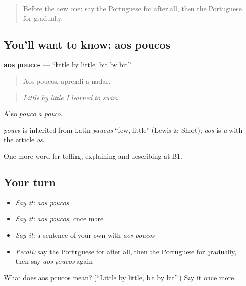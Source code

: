 \label{lesson:PT-C274-aos-poucos}



\begin{quote}
Before the new one: say the Portuguese for after all, then the Portuguese for gradually.
\end{quote}

\subsection*{You'll want to know: aos poucos}
\textbf{aos poucos} — \textquotedblleft{}little by little, bit by bit\textquotedblright{}.

\begin{quote}
Aos poucos, aprendi a nadar.
\end{quote}

\begin{quote}
\emph{Little by little I learned to swim.}
\end{quote}

Also \emph{pouco a pouco}.

\begin{cousinweb}
\emph{pouco} is inherited from Latin \emph{paucus} \textquotedblleft{}few, little\textquotedblright{} (Lewis \& Short); \emph{aos} is \emph{a} with the article \emph{os}.
\end{cousinweb}

\begin{grammarlens}[title={What you've built}]
One more word for telling, explaining and describing at B1.
\end{grammarlens}

\subsection*{Your turn}
\begin{itemize}
\raggedright
  \item \emph{Say it:} \emph{aos poucos}
  \item \emph{Say it:} \emph{aos poucos}, once more
  \item \emph{Say it:} a sentence of your own with \emph{aos poucos}
  \item \emph{Recall:} say the Portuguese for after all, then the Portuguese for gradually, then say \emph{aos poucos} again
\end{itemize}

\begin{tcolorbox}[breakable,colback=teal!4,colframe=teal!35!black,title={Before you move on}]
What does aos poucos mean? (\textquotedblleft{}Little by little, bit by bit\textquotedblright{}.) Say it once more.
\end{tcolorbox}
